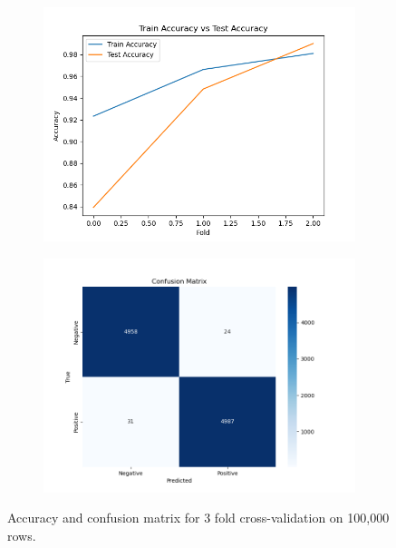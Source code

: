     \begin{figure}[h]
        \centering
        \begin{subfigure}{0.49\textwidth}
            \centering
            \includegraphics[width=\textwidth]{figures/cross_validation_100000_accuracy_3f.png}
        \end{subfigure}
        \begin{subfigure}{0.49\textwidth}
            \centering
            \includegraphics[width=\textwidth]{figures/cross_validation_100000_confusion_3f.png}
        \end{subfigure}
        \caption{Accuracy and confusion matrix for 3 fold cross-validation on 100,000 rows.}
    \end{figure}
    \FloatBarrier

